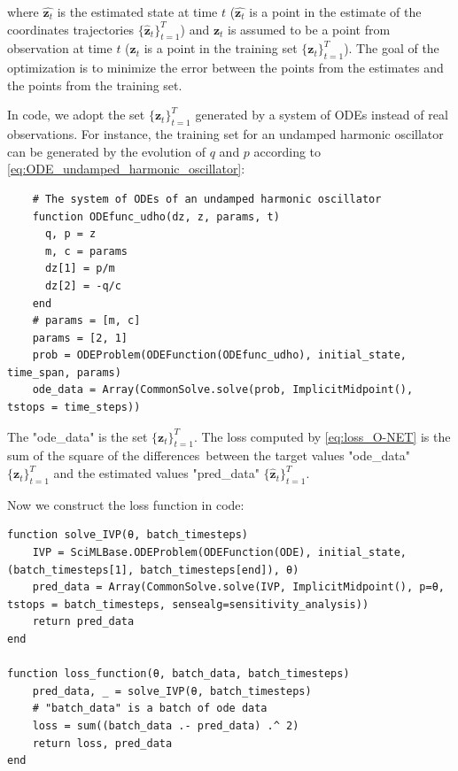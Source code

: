 \documentclass[
	parskip, 			   %
	twoside, 			   %
	DIV=14, 			   %
	BCOR=15.0mm, 		   %
	headsepline, 		   %
	open=right, 		   %
	captions=tableheading, %
	bibliography=totoc,    %
	numbers=noenddot       %
]{scrreprt}
\begin{document}
where $\hat{\mathbf{z}_{t}}$ is the estimated state at time $t$ ($\hat{\mathbf{z}_{t}}$ is a point in the estimate of the coordinates trajectories $\{ \mathbf{\hat{z}}_{t} \}_{t=1}^{T}$) and $\mathbf{z}_{t}$ is assumed to be a point from observation at time $t$ (${\mathbf{z}_{t}}$ is a point in the training set $\{ \mathbf{z}_{t} \}_{t=1}^{T}$). The goal of the optimization is to minimize the error between the points from the estimates and the points from the training set.

In code, we adopt the set $\{ \mathbf{z}_{t} \}_{t=1}^{T}$ generated by a system of ODEs instead of real observations. For instance, the training set for an undamped harmonic oscillator can be generated by the evolution of $q$ and $p$ according to \ref{eq:ODE_undamped_harmonic_oscillator}:

\begin{verbatim}
    # The system of ODEs of an undamped harmonic oscillator
    function ODEfunc_udho(dz, z, params, t)
      q, p = z
      m, c = params
      dz[1] = p/m
      dz[2] = -q/c
    end
    # params = [m, c]
    params = [2, 1] 
    prob = ODEProblem(ODEFunction(ODEfunc_udho), initial_state, time_span, params)
    ode_data = Array(CommonSolve.solve(prob, ImplicitMidpoint(), tstops = time_steps))
\end{verbatim}

The "ode\_data" is the set $\{ \mathbf{z}_{t} \}_{t=1}^{T}$. The loss computed by \ref{eq:loss_O-NET} is the sum of the square of the differences between the target values "ode\_data" $\{ \mathbf{z}_{t} \}_{t=1}^{T}$ and the estimated values "pred\_data" $\{ \mathbf{\hat{z}}_{t} \}_{t=1}^{T}$.

Now we construct the loss function in code:
\begin{verbatim}
function solve_IVP(θ, batch_timesteps)
    IVP = SciMLBase.ODEProblem(ODEFunction(ODE), initial_state, (batch_timesteps[1], batch_timesteps[end]), θ)
    pred_data = Array(CommonSolve.solve(IVP, ImplicitMidpoint(), p=θ, tstops = batch_timesteps, sensealg=sensitivity_analysis))
    return pred_data
end

function loss_function(θ, batch_data, batch_timesteps)
    pred_data, _ = solve_IVP(θ, batch_timesteps)
    # "batch_data" is a batch of ode data
    loss = sum((batch_data .- pred_data) .^ 2)
    return loss, pred_data
end
\end{verbatim}
\end{document}

